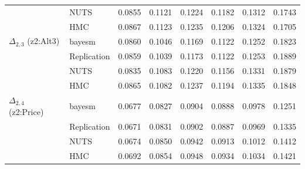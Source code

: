 \begin{tabular}{llcccccc}
 & NUTS & 0.0855 & 0.1121 & 0.1224 & 0.1182 & 0.1312 & 0.1743 \\
 & HMC & 0.0867 & 0.1123 & 0.1235 & 0.1206 & 0.1324 & 0.1705 \\
$\Delta_{2,3}$ (z2:Alt3) & bayesm & 0.0860 & 0.1046 & 0.1169 & 0.1122 & 0.1252 & 0.1823 \\
 & Replication & 0.0859 & 0.1039 & 0.1173 & 0.1122 & 0.1253 & 0.1889 \\
 & NUTS & 0.0835 & 0.1083 & 0.1220 & 0.1156 & 0.1331 & 0.1879 \\
 & HMC & 0.0865 & 0.1082 & 0.1237 & 0.1194 & 0.1335 & 0.1848 \\
$\Delta_{2,4}$ (z2:Price) & bayesm & 0.0677 & 0.0827 & 0.0904 & 0.0888 & 0.0978 & 0.1251 \\
 & Replication & 0.0671 & 0.0831 & 0.0902 & 0.0887 & 0.0969 & 0.1335 \\
 & NUTS & 0.0674 & 0.0850 & 0.0942 & 0.0913 & 0.1012 & 0.1412 \\
 & HMC & 0.0692 & 0.0854 & 0.0948 & 0.0934 & 0.1034 & 0.1421 \\
\bottomrule
\end{tabular}
